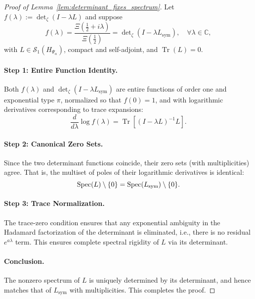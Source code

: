\begin{proof}[Proof of Lemma~\ref{lem:determinant_fixes_spectrum}]
Let \( f(\lambda) := \det\nolimits_\zeta(I - \lambda L) \) and suppose
\[
f(\lambda) = \frac{\Xi(\tfrac{1}{2} + i\lambda)}{\Xi(\tfrac{1}{2})}
= \det\nolimits_\zeta(I - \lambda L_{\mathrm{sym}}),
\quad \forall \lambda \in \mathbb{C},
\]
with \( L \in \mathcal{S}_1(H_{\Psi_\alpha}) \), compact and self-adjoint, and \( \operatorname{Tr}(L) = 0 \).

\paragraph{Step 1: Entire Function Identity.}
Both \( f(\lambda) \) and \( \det\nolimits_\zeta(I - \lambda L_{\mathrm{sym}}) \) are entire functions of order one and exponential type \( \pi \), normalized so that \( f(0) = 1 \), and with logarithmic derivatives corresponding to trace expansions:
\[
\frac{d}{d\lambda} \log f(\lambda)
= \operatorname{Tr}[(I - \lambda L)^{-1} L].
\]

\paragraph{Step 2: Canonical Zero Sets.}
Since the two determinant functions coincide, their zero sets (with multiplicities) agree. That is, the multiset of poles of their logarithmic derivatives is identical:
\[
\operatorname{Spec}(L) \setminus \{0\} = \operatorname{Spec}(L_{\mathrm{sym}}) \setminus \{0\}.
\]

\paragraph{Step 3: Trace Normalization.}
The trace-zero condition ensures that any exponential ambiguity in the Hadamard factorization of the determinant is eliminated, i.e., there is no residual \( e^{a\lambda} \) term. This ensures complete spectral rigidity of \( L \) via its determinant.

\paragraph{Conclusion.}
The nonzero spectrum of \( L \) is uniquely determined by its determinant, and hence matches that of \( L_{\mathrm{sym}} \) with multiplicities. This completes the proof.
\end{proof}
% 